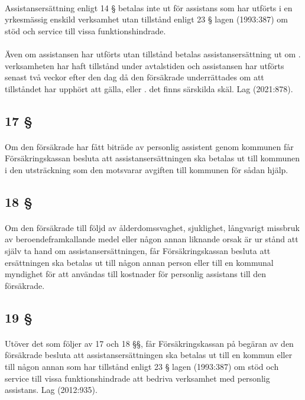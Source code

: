 \documentclass[a4paper,notitlepage,openany,10pt]{book}
\begin{document}
\paragraph*{}
Assistansersättning enligt 14 § betalas inte ut för assistans som har utförts i en yrkesmässig enskild verksamhet utan tillstånd enligt 23 § lagen (1993:387) om stöd och service till vissa funktionshindrade.
\paragraph*{}
Även om assistansen har utförts utan tillstånd betalas assistansersättning ut om
. verksamheten har haft tillstånd under avtalstiden och assistansen har utförts senast två veckor efter den dag då den försäkrade underrättades om att tillståndet har upphört att gälla, eller
. det finns särskilda skäl.
Lag (2021:878).
\subsection*{17 §}
\paragraph*{}
Om den försäkrade har fått biträde av personlig assistent genom kommunen får Försäkringskassan besluta att assistansersättningen ska betalas ut till kommunen i den utsträckning som den motsvarar avgiften till kommunen för sådan hjälp.
\subsection*{18 §}
\paragraph*{}
Om den försäkrade till följd av ålderdomssvaghet, sjuklighet, långvarigt missbruk av beroendeframkallande medel eller någon annan liknande orsak är ur stånd att själv ta hand om assistansersättningen, får Försäkringskassan besluta att ersättningen ska betalas ut till någon annan person eller till en kommunal myndighet för att användas till kostnader för personlig assistans till den försäkrade.
\subsection*{19 §}
\paragraph*{}
Utöver det som följer av 17 och 18 §§, får Försäkringskassan på begäran av den försäkrade besluta att assistansersättningen ska betalas ut till en kommun eller till någon annan som har tillstånd enligt 23 § lagen (1993:387) om stöd och service till vissa funktionshindrade att bedriva verksamhet med personlig assistans.
Lag (2012:935).
\end{document}
